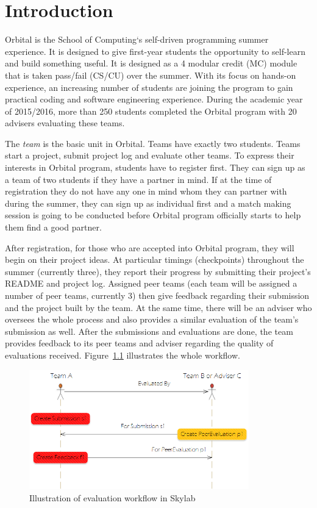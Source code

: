 \chapter{Introduction} \label{introduction}

Orbital is the School of Computing`s self-driven programming summer experience. It is designed to give first-year students the opportunity to self-learn and build something useful. It is designed as a 4 modular credit (MC) module that is taken pass/fail (CS/CU) over the summer\cite{citation0}. With its focus on hands-on experience, an increasing number of students are joining the program to gain practical coding and software engineering experience. During the academic year of 2015/2016, more than 250 students completed the Orbital program with 20 advisers evaluating these teams.

The {\it team} is the basic unit in Orbital.  Teams have exactly two students.  Teams start a project, submit project log and evaluate other teams. To express their interests in Orbital program, students have to register 
first. They can sign up as a team of two students if they have a partner in mind. If at the time of registration they do not have any one in mind whom they can partner with during the summer, they can sign up as individual first and a match making session is going to be conducted before Orbital program officially starts to help them find a good partner.

After registration, for those who are accepted into Orbital program, they will begin on their project ideas.  At particular timings (checkpoints) throughout the summer (currently three), they report their progress by submitting their project's README and project log.  Assigned peer teams (each team will be assigned a number of peer teams, currently 3) then give feedback regarding their submission and the project built by the team. At the same time, there will be an adviser who oversees the whole process and also provides a similar evaluation of the team's submission as well. After the submissions and evaluations are done, the team provides feedback to its peer teams and adviser regarding the quality of evaluations received. Figure~\ref{fig:EvaluationWorkflow} illustrates the whole workflow.

\begin{figure}[h]
  \centering
  \includegraphics[width=0.85\textwidth]{Images/Skylab_Evaluation_Workflow.png}
  \caption{Illustration of evaluation workflow in Skylab}
  \label{fig:EvaluationWorkflow}
\end{figure}

